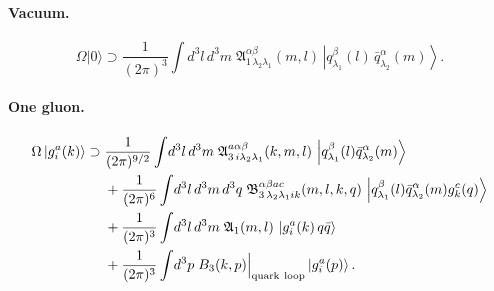 \documentclass[11pt,a4paper]{article}
\numberwithin{equation}{section}
\newcommand{\mf}[1]{\mathfrak{#1}}
\newcommand{\ket}[1]{\left|#1\right\rangle}
\newcommand{\vac}{|0\rangle}
\newcommand{\OM}{\Omega}
\newcommand{\qk}[3]{q^{#1}_{#2}(#3)}
\newcommand{\aqk}[3]{\bar q^{#1}_{#2}(#3)}
\newcommand{\gl}[3]{g^{#1}_{#2}(#3)}
\begin{document}
\paragraph{Vacuum.}
\begin{equation}
\OM\vac\supset\frac{1}{(2\pi)^{3}}\int\!d^{3}l\,d^{3}m\;\mf A^{\alpha\beta}_{1\,\lambda_{2}\lambda_{1}}(m,l)\,
\ket{\qk{\beta}{\lambda_{1}}{l}\,\aqk{\alpha}{\lambda_{2}}{m}} .
\label{eq:Omvac}
\end{equation}

\paragraph{One gluon.}
\begin{align}
\OM\ket{\gl{a}{i}{k}}\supset\;&\frac{1}{(2\pi)^{9/2}}\int\!d^{3}l\,d^{3}m\;
\mf A^{a\alpha\beta}_{3\,i\lambda_{2}\lambda_{1}}(k,m,l)\,\ket{\qk{\beta}{\lambda_{1}}{l}\aqk{\alpha}{\lambda_{2}}{m}}
\nonumber\\
&+\frac{1}{(2\pi)^{6}}\int\!d^{3}l\,d^{3}m\,d^{3}q\;\mf B^{\alpha\beta ac}_{3\,\lambda_{2}\lambda_{1}ik}(m,l,k,q)\,
\ket{\qk{\beta}{\lambda_{1}}{l}\aqk{\alpha}{\lambda_{2}}{m}\gl{c}{k}{q}}
\nonumber\\
&+\frac{1}{(2\pi)^{3}}\int\!d^{3}l\,d^{3}m\;\mf A_{1}(m,l)\,\ket{\gl{a}{i}{k}\,q\bar q}
\nonumber\\
&+\frac{1}{(2\pi)^{3}}\int\!d^{3}p\;B_{3}(k,p)\Big|_{\rm quark\ loop}\ket{\gl{a}{i}{p}} .
\label{eq:Omg}
\end{align}
\end{document}
